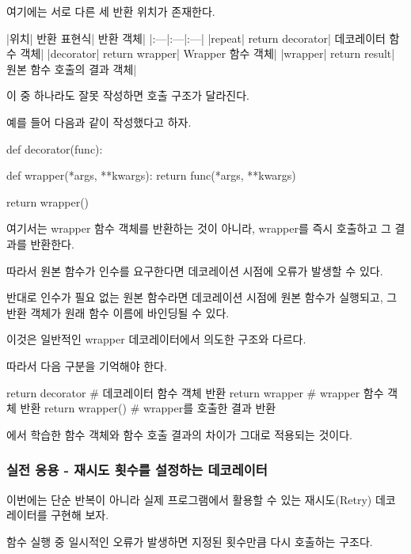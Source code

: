 여기에는 서로 다른 세 반환 위치가 존재한다.

\begin{dhktable}
|위치|	반환 표현식|	반환 객체|
|:---|:---|:---|
|repeat|	return decorator|	데코레이터 함수 객체|
|decorator|	return wrapper|	Wrapper 함수 객체|
|wrapper|	return result|	원본 함수 호출의 결과 객체|
\end{dhktable}

이 중 하나라도 잘못 작성하면 호출 구조가 달라진다.

예를 들어 다음과 같이 작성했다고 하자.

\begin{dhkcode}
def decorator(func):

    def wrapper(*args, **kwargs):
        return func(*args, **kwargs)

    return wrapper()
\end{dhkcode}

여기서는 wrapper 함수 객체를 반환하는 것이 아니라, wrapper를 즉시 호출하고 그 결과를 반환한다.

따라서 원본 함수가 인수를 요구한다면 데코레이션 시점에 오류가 발생할 수 있다.

반대로 인수가 필요 없는 원본 함수라면 데코레이션 시점에 원본 함수가 실행되고, 그 반환 객체가 원래 함수 이름에 바인딩될 수 있다.

이것은 일반적인 wrapper 데코레이터에서 의도한 구조와 다르다.

따라서 다음 구분을 기억해야 한다.

\begin{dhkcode}
return decorator  # 데코레이터 함수 객체 반환
return wrapper    # wrapper 함수 객체 반환
return wrapper()  # wrapper를 호출한 결과 반환
\end{dhkcode}

에서 학습한 함수 객체와 함수 호출 결과의 차이가 그대로 적용되는 것이다.

\subsubsection{실전 응용 - 재시도 횟수를 설정하는 데코레이터}

이번에는 단순 반복이 아니라 실제 프로그램에서 활용할 수 있는 재시도(Retry) 데코레이터를 구현해 보자.

함수 실행 중 일시적인 오류가 발생하면 지정된 횟수만큼 다시 호출하는 구조다.


